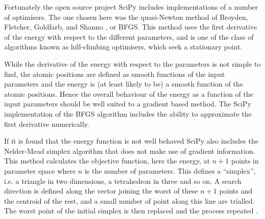Fortunately the open source project SciPy includes implementations of a number of optimisers. The one chosen here was the quasi-Newton method of Broyden, Fletcher, Goldfarb, and Shanno \citep{SciPy2001,nocedal2006}, or BFGS. This method uses the first derivative of the energy with respect to the different parameters, and is one of the class of algorithms known as hill-climbing optimisers, which seek a stationary point.

While the derivative of the energy with respect to the parameters is not simple to find, the atomic positions are defined as smooth functions of the input parameters and the energy is (at least likely to be) a smooth function of the atomic positions. Hence the overall behaviour of the energy as a function of the input parameters should be well suited to a gradient based method. The SciPy implementation of the BFGS algorithm includes the ability to approximate the first derivative numerically.

If it is found that the energy function is not well behaved SciPy also includes the Nelder-Mead simplex algorithm that does not make use of gradient information. This method calculates the objective function, here the energy, at $n+1$ points in parameter space where $n$ is the number of parameters. This defines a ``simplex'', i.e. a triangle in two dimensions, a tetrahedron in three and so on. A search direction is defined along the vector joining the worst of these $n+1$ points and the centroid of the rest, and a small number of point along this line are trialled. The worst point of the initial simplex is then replaced and the process repeated \citep{Nelder1965,Gao2012}.























































